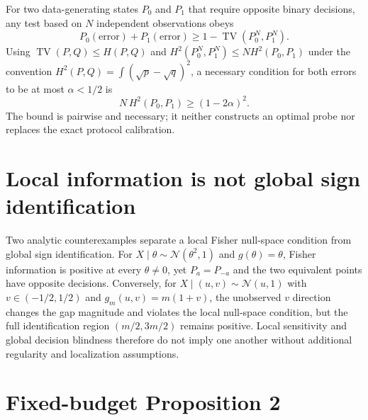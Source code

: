 \documentclass[10pt,twocolumn]{article}
\begin{document}
For two data-generating states $P_0$ and $P_1$ that require opposite binary
decisions, any test based on $N$ independent observations obeys
\begin{equation}
  P_0(\text{error})+P_1(\text{error})
  \ge 1-\operatorname{TV}(P_0^{N},P_1^{N}).
\end{equation}
Using $\operatorname{TV}(P,Q)\le H(P,Q)$ and
$H^2(P_0^N,P_1^N)\le N H^2(P_0,P_1)$ under the convention
$H^2(P,Q)=\int(\sqrt p-\sqrt q)^2$, a necessary condition for both errors to
be at most $\alpha<1/2$ is
\begin{equation}
  N\,H^2(P_0,P_1)\ge (1-2\alpha)^2.
\end{equation}
The bound is pairwise and necessary; it neither constructs an optimal probe nor
replaces the exact protocol calibration.

\section{Local information is not global sign identification}

Two analytic counterexamples separate a local Fisher null-space condition from
global sign identification. For $X\mid\theta\sim\mathcal N(\theta^2,1)$ and
$g(\theta)=\theta$, Fisher information is positive at every $\theta\neq0$, yet
$P_a=P_{-a}$ and the two equivalent points have opposite decisions. Conversely,
for $X\mid(u,v)\sim\mathcal N(u,1)$ with $v\in(-1/2,1/2)$ and
$g_m(u,v)=m(1+v)$, the unobserved $v$ direction changes the gap magnitude and
violates the local null-space condition, but the full identification region
$(m/2,3m/2)$ remains positive. Local sensitivity and global decision blindness
therefore do not imply one another without additional regularity and
localization assumptions.

\section{Fixed-budget Proposition 2}
\end{document}
